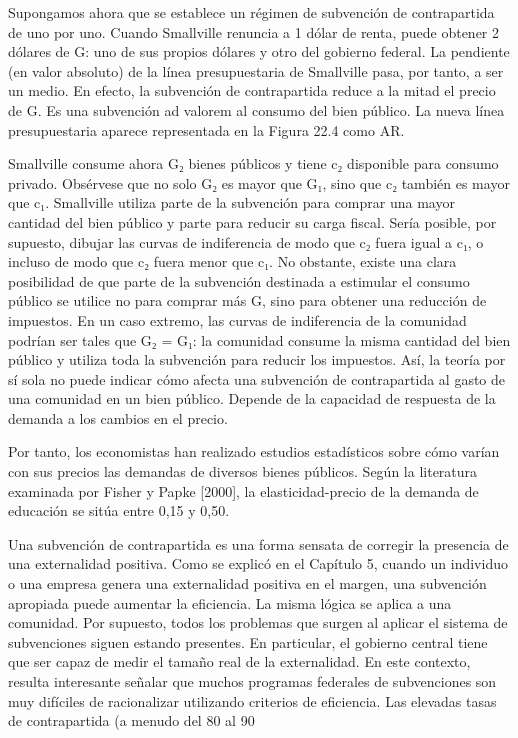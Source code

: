\documentclass[10pt,a4paper]{article}
\begin{document}
Supongamos ahora que se establece un régimen de subvención de contrapartida de uno por uno. Cuando Smallville renuncia a 1 dólar de renta, puede obtener 2 dólares de G: uno de sus propios dólares y otro del gobierno federal. La pendiente (en valor absoluto) de la línea presupuestaria de Smallville pasa, por tanto, a ser un medio. En efecto, la subvención de contrapartida reduce a la mitad el precio de G. Es una subvención ad valorem al consumo del bien público. La nueva línea presupuestaria aparece representada en la Figura 22.4 como AR.

Smallville consume ahora G₂ bienes públicos y tiene c₂ disponible para consumo privado. Obsérvese que no solo G₂ es mayor que G₁, sino que c₂ también es mayor que c₁. Smallville utiliza parte de la subvención para comprar una mayor cantidad del bien público y parte para reducir su carga fiscal. Sería posible, por supuesto, dibujar las curvas de indiferencia de modo que c₂ fuera igual a c₁, o incluso de modo que c₂ fuera menor que c₁. No obstante, existe una clara posibilidad de que parte de la subvención destinada a estimular el consumo público se utilice no para comprar más G, sino para obtener una reducción de impuestos. En un caso extremo, las curvas de indiferencia de la comunidad podrían ser tales que G₂ = G₁: la comunidad consume la misma cantidad del bien público y utiliza toda la subvención para reducir los impuestos. Así, la teoría por sí sola no puede indicar cómo afecta una subvención de contrapartida al gasto de una comunidad en un bien público. Depende de la capacidad de respuesta de la demanda a los cambios en el precio.

Por tanto, los economistas han realizado estudios estadísticos sobre cómo varían con sus precios las demandas de diversos bienes públicos. Según la literatura examinada por Fisher y Papke [2000], la elasticidad-precio de la demanda de educación se sitúa entre 0,15 y 0,50.

Una subvención de contrapartida es una forma sensata de corregir la presencia de una externalidad positiva. Como se explicó en el Capítulo 5, cuando un individuo o una empresa genera una externalidad positiva en el margen, una subvención apropiada puede aumentar la eficiencia. La misma lógica se aplica a una comunidad. Por supuesto, todos los problemas que surgen al aplicar el sistema de subvenciones siguen estando presentes. En particular, el gobierno central tiene que ser capaz de medir el tamaño real de la externalidad. En este contexto, resulta interesante señalar que muchos programas federales de subvenciones son muy difíciles de racionalizar utilizando criterios de eficiencia. Las elevadas tasas de contrapartida (a menudo del 80 al 90 %
\end{document}
